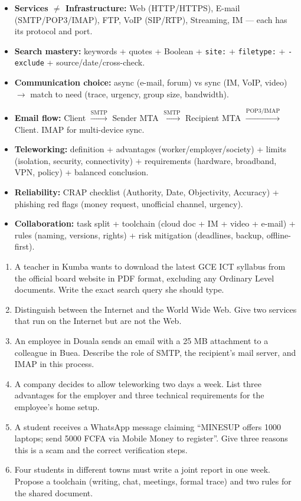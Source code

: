 \documentclass[11pt]{article}
\begin{document}
\begin{aretenir}
\begin{itemize}
\item \textbf{Services $\neq$ Infrastructure:} Web (HTTP/HTTPS), E-mail (SMTP/POP3/IMAP), FTP, VoIP (SIP/RTP), Streaming, IM --- each has its protocol and port.
\item \textbf{Search mastery:} keywords + quotes + Boolean + \texttt{site:} + \texttt{filetype:} + \texttt{-exclude} + source/date/cross-check.
\item \textbf{Communication choice:} async (e-mail, forum) vs sync (IM, VoIP, video) $\rightarrow$ match to need (trace, urgency, group size, bandwidth).
\item \textbf{Email flow:} Client $\xrightarrow{\text{SMTP}}$ Sender MTA $\xrightarrow{\text{SMTP}}$ Recipient MTA $\xrightarrow{\text{POP3/IMAP}}$ Client. IMAP for multi-device sync.
\item \textbf{Teleworking:} definition + advantages (worker/employer/society) + limits (isolation, security, connectivity) + requirements (hardware, broadband, VPN, policy) + balanced conclusion.
\item \textbf{Reliability:} CRAP checklist (Authority, Date, Objectivity, Accuracy) + phishing red flags (money request, unofficial channel, urgency).
\item \textbf{Collaboration:} task split + toolchain (cloud doc + IM + video + e-mail) + rules (naming, versions, rights) + risk mitigation (deadlines, backup, offline-first).
\end{itemize}
\end{aretenir}

\begin{exercice}
\begin{enumerate}
\item A teacher in Kumba wants to download the latest GCE ICT syllabus from the official board website in PDF format, excluding any Ordinary Level documents. Write the exact search query she should type.
\item Distinguish between the Internet and the World Wide Web. Give two services that run on the Internet but are not the Web.
\item An employee in Douala sends an email with a 25 MB attachment to a colleague in Buea. Describe the role of SMTP, the recipient's mail server, and IMAP in this process.
\item A company decides to allow teleworking two days a week. List three advantages for the employer and three technical requirements for the employee's home setup.
\item A student receives a WhatsApp message claiming ``MINESUP offers 1000 laptops; send 5000 FCFA via Mobile Money to register''. Give three reasons this is a scam and the correct verification steps.
\item Four students in different towns must write a joint report in one week. Propose a toolchain (writing, chat, meetings, formal trace) and two rules for the shared document.
\end{enumerate}
\end{exercice}
\end{document}
